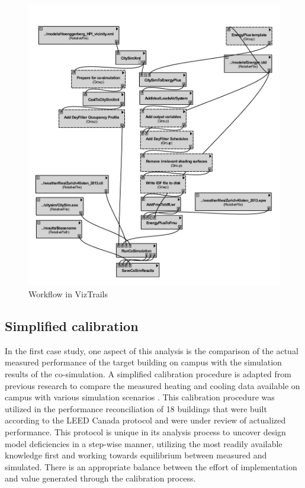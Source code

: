 \documentclass{tBPS2e}
\theoremstyle{plain}
\theoremstyle{definition}
\theoremstyle{remark}
\begin{document}
\begin{figure}[H]
  \centering
  \includegraphics[width=1.0\textwidth]{figures/36-cosim-HPI}
  \caption{Workflow in VizTrails
  \label{VizTrails}}
\end{figure}

\subsection{Simplified calibration}
In the first case study, one aspect of this analysis is the comparison of the actual measured performance of the target building on campus with the
simulation results of the co-simulation. A simplified calibration procedure is
adapted from previous research to compare the measured heating and cooling
data available on campus with various simulation scenarios
\citep{samuelson_analysis_2015}. This calibration procedure was utilized in the
performance reconciliation of 18 buildings that were built according to the
LEED Canada protocol and were under review of actualized performance. This
protocol is unique in its analysis process to uncover design model
deficiencies in a step-wise manner, utilizing the most readily available
knowledge first and working towards equilibrium between measured and
simulated. There is an appropriate balance between the effort of implementation and value
generated through the calibration process.
\end{document}

